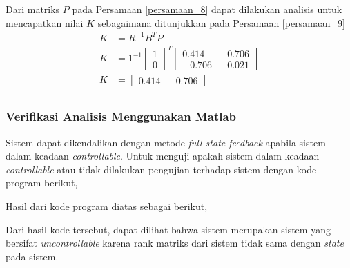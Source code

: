 \documentclass[../main.tex]{subfiles}
\begin{document}
                Dari matriks $P$ pada Persamaan \eqref{persamaan_8} dapat dilakukan analisis untuk mencapatkan nilai $K$ sebagaimana ditunjukkan pada Persamaan \eqref{persamaan_9}
                \begin{equation}
                    \begin{split}
                        K &= R^{-1} B^T P \\[5pt]
                        K &= 1^{-1} \begin{bmatrix} 1 \\ 0 \end{bmatrix}^T \begin{bmatrix} 0.414 & -0.706 \\ -0.706 & -0.021\end{bmatrix} \\[5pt]
                        K &= \begin{bmatrix} 0.414 & -0.706 \end{bmatrix} \\[5pt]
                        \label{persamaan_9}
                    \end{split}
                \end{equation}
            \subsubsection{Verifikasi Analisis Menggunakan Matlab}
                Sistem dapat dikendalikan dengan metode \textit{full state feedback} apabila sistem dalam keadaan \textit{controllable}. Untuk menguji apakah sistem dalam keadaan \textit{controllable} atau tidak dilakukan pengujian terhadap sistem dengan kode program berikut,
                
                Hasil dari kode program diatas sebagai berikut,
                
                Dari hasil kode tersebut, dapat dilihat bahwa sistem merupakan sistem yang bersifat \textit{uncontrollable} karena rank matriks dari sistem tidak sama dengan \textit{state} pada sistem.
\end{document}
